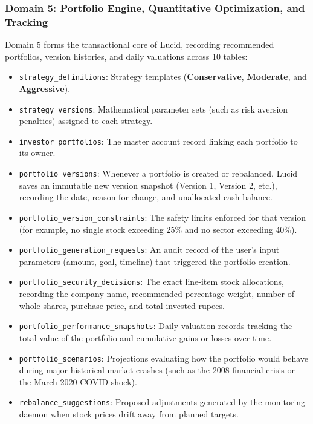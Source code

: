 \clearpage
\subsubsection{Domain 5: Portfolio Engine, Quantitative Optimization, and Tracking}
Domain 5 forms the transactional core of Lucid, recording recommended portfolios, version histories, and daily valuations across 10 tables:
\begin{itemize}
    \item \texttt{strategy\_definitions}: Strategy templates (\textbf{Conservative}, \textbf{Moderate}, and \textbf{Aggressive}).
    \item \texttt{strategy\_versions}: Mathematical parameter sets (such as risk aversion penalties) assigned to each strategy.
    \item \texttt{investor\_portfolios}: The master account record linking each portfolio to its owner.
    \item \texttt{portfolio\_versions}: Whenever a portfolio is created or rebalanced, Lucid saves an immutable new version snapshot (Version 1, Version 2, etc.), recording the date, reason for change, and unallocated cash balance.
    \item \texttt{portfolio\_version\_constraints}: The safety limits enforced for that version (for example, no single stock exceeding 25\% and no sector exceeding 40\%).
    \item \texttt{portfolio\_generation\_requests}: An audit record of the user's input parameters (amount, goal, timeline) that triggered the portfolio creation.
    \item \texttt{portfolio\_security\_decisions}: The exact line-item stock allocations, recording the company name, recommended percentage weight, number of whole shares, purchase price, and total invested rupees.
    \item \texttt{portfolio\_performance\_snapshots}: Daily valuation records tracking the total value of the portfolio and cumulative gains or losses over time.
    \item \texttt{portfolio\_scenarios}: Projections evaluating how the portfolio would behave during major historical market crashes (such as the 2008 financial crisis or the March 2020 COVID shock).
    \item \texttt{rebalance\_suggestions}: Proposed adjustments generated by the monitoring daemon when stock prices drift away from planned targets.
\end{itemize}

